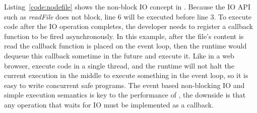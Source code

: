 Listing~\ref{code:nodefile} shows the non-block IO concept in \nodejs.
Because the IO API such as \emph{readFile} does not
block, line 6 will be executed before line 3.
To execute code after the IO operation completes,
the developer needs to register a callback function to be fired asynchronously.
In this example, after the file's content is read the callback function is placed on the
event loop,
then the runtime would dequeue this callback sometime in the future and execute it.
Like in a web browser, \nodejs execute \js code in a single thread,
and the runtime will not halt the current execution in the middle to execute something in
the event loop, so it is easy to write concurrent safe programs.
The event based non-blocking IO and simple execution semantics 
is key to the performance of \nodejs, 
the downside is that any operation that waits for IO must be implemented as a callback.
